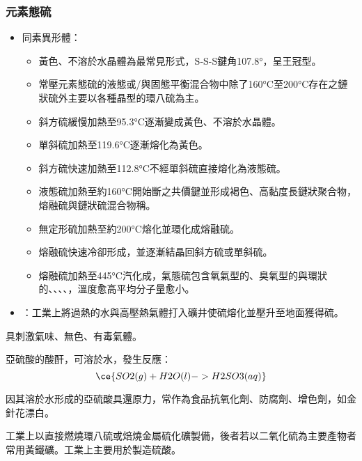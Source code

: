 \documentclass[a4paper,12pt]{report}
\begin{document}
\subsubsection{元素態硫}
\begin{itemize}
\item 同素異形體：
\begin{itemize}
\item 黃色、不溶於水晶體為最常見形式，S-S-S鍵角107.8°，呈王冠型。
\item 常壓元素態硫的液態或/與固態平衡混合物中除了160°C至200°C存在之鏈狀硫外主要以各種晶型的環八硫為主。
\item 斜方硫緩慢加熱至95.3°C逐漸變成黃色、不溶於水晶體。
\item 單斜硫加熱至119.6°C逐漸熔化為黃色。
\item 斜方硫快速加熱至112.8°C不經單斜硫直接熔化為液態硫。
\item 液態硫加熱至約160°C開始斷之共價鍵並形成褐色、高黏度長鏈狀聚合物，熔融硫與鏈狀硫混合物稱。
\item 無定形硫加熱至約200°C熔化並環化成熔融硫。
\item 熔融硫快速冷卻形成，並逐漸結晶回斜方硫或單斜硫。
\item 熔融硫加熱至445°C汽化成，氣態硫包含氧氣型的、臭氧型的與環狀的、、、、，溫度愈高平均分子量愈小。
\end{itemize}
\item {}：工業上將過熱的水與高壓熱氣體打入礦井使硫熔化並壓升至地面獲得硫。
\end{itemize}
\bit
\item 具刺激氣味、無色、有毒氣體。
\item 亞硫酸的酸酐，可溶於水，發生反應：
\[\ce{SO2(g) + H2O(l) -> H2SO3(aq)}\]
\item 因其溶於水形成的亞硫酸具還原力，常作為食品抗氧化劑、防腐劑、增色劑，如金針花漂白。
\item 工業上以直接燃燒環八硫或焙燒金屬硫化礦製備，後者若以二氧化硫為主要產物者常用黃鐵礦。工業上主要用於製造硫酸。
\eit
\end{document}
